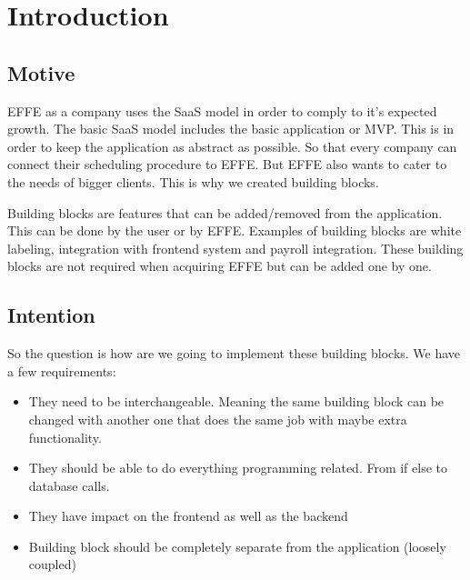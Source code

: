 \chapter{Introduction}

\section{Motive}
EFFE as a company uses the SaaS model in order to comply to it’s expected growth. The basic SaaS model includes the basic application or MVP. This is in order to keep the application as abstract as possible. So that every company can connect their scheduling procedure to EFFE. But EFFE also wants to cater to the needs of bigger clients. This is why we created building blocks.

Building blocks are features that can be added/removed from the application. This can be done by the user or by EFFE. Examples of building blocks are white labeling, integration with frontend system and payroll integration. These building blocks are not required when acquiring EFFE but can be added one by one.

\section{Intention}
\label{sec:Intention}

So the question is how are we going to implement these building blocks. We have a few requirements:
\begin{itemize}
	\item They need to be interchangeable. Meaning the same building block can be changed with another one that does the same job with maybe extra functionality.
	
	\item They should be able to do everything programming related. From if else to database calls.
	
	\item They have impact on the frontend as well as the backend
	
	\item Building block should be completely separate from the application (loosely coupled)
\end{itemize}
